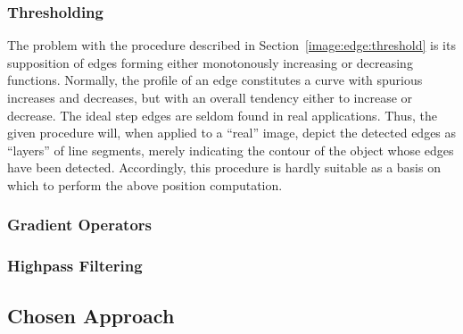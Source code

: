 \subsubsection{Thresholding}

The problem with the procedure described in
Section~\ref{image:edge:threshold} is its supposition of edges forming
either monotonously increasing or decreasing functions.  Normally, the
profile of an edge constitutes a curve with spurious increases and
decreases, but with an overall tendency either to increase or
decrease.  The ideal step edges are seldom found in real applications.
Thus, the given procedure will, when applied to a ``real'' image,
depict the detected edges as ``layers'' of line segments, merely
indicating the contour of the object whose edges have been detected.
Accordingly, this procedure is hardly suitable as a basis on which to
perform the above position computation.

\subsubsection{Gradient Operators}



\subsubsection{Highpass Filtering}

\subsection{Chosen Approach}
\label{image:concl:approach}

